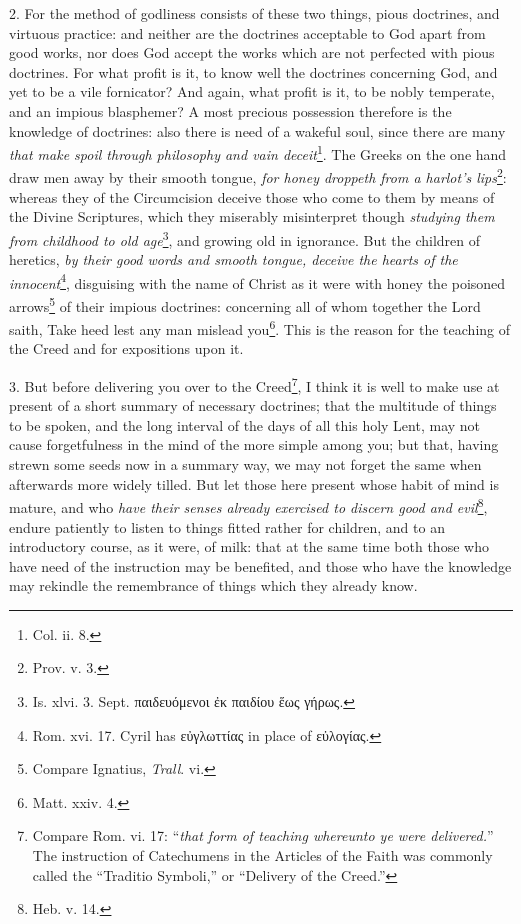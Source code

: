 2. For the method of godliness consists of these two things, pious doctrines, and virtuous practice: and neither are the doctrines acceptable to God apart from good works, nor does God accept the works which are not perfected with pious doctrines. For what profit is it, to know well the doctrines concerning God, and yet to be a vile fornicator? And again, what profit is it, to be nobly temperate, and an impious blasphemer? A most precious possession therefore is the knowledge of doctrines: also there is need of a wakeful soul, since there are many \emph{that make spoil through philosophy and vain deceit}\footnote{Col. ii. 8.}. The Greeks on the one hand draw men away by their smooth tongue, \emph{for honey droppeth from a harlot’s lips}\footnote{Prov. v. 3.}: whereas they of the Circumcision deceive those who come to them by means of the Divine Scriptures, which they miserably misinterpret though \emph{studying them from childhood to old age}\footnote{Is. xlvi. 3. Sept. \textgreek{παιδευόμενοι ἐκ παιδίου ἕως γήρως}.}, and growing old in ignorance. But the children of heretics, \emph{by their good words and smooth tongue, deceive the hearts of the innocent}\footnote{Rom. xvi. 17. Cyril has \textgreek{εὐγλωττίας} in place of \textgreek{εὐλογίας}.}, disguising with the name of Christ as it were with honey the poisoned arrows\footnote{Compare Ignatius, \emph{Trall}. vi.} of their impious doctrines: concerning all of whom together the Lord saith, Take heed lest any man mislead you\footnote{Matt. xxiv. 4.}. This is the reason for the teaching of the Creed and for expositions upon it.

3. But before delivering you over to the Creed\footnote{Compare Rom. vi. 17: “\emph{that form of teaching whereunto ye were delivered.}” The instruction of Catechumens in the Articles of the Faith was commonly called the “Traditio Symboli,” or “Delivery of the Creed.”}, I think it is well to make use at present of a short summary of necessary doctrines; that the multitude of things to be spoken, and the long interval of the days of all this holy Lent, may not cause forgetfulness in the mind of the more simple among you; but that, having strewn some seeds now in a summary way, we may not forget the same when afterwards more widely tilled. But let those here present whose habit of mind is mature, and who \emph{have their senses already exercised to discern good and evil}\footnote{Heb. v. 14.}, endure patiently to listen to things fitted rather for children, and to an introductory course, as it were, of milk: that at the same time both those who have need of the instruction may be benefited, and those who have the knowledge may rekindle the remembrance of things which they already know.

